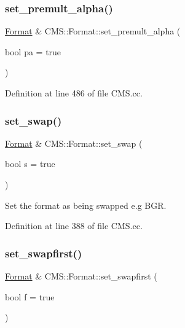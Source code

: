 \subsubsection{\texorpdfstring{set\+\_\+premult\+\_\+alpha()}{set\_premult\_alpha()}}
{\footnotesize\ttfamily \hyperlink{class_c_m_s_1_1_format}{Format} \& C\+M\+S\+::\+Format\+::set\+\_\+premult\+\_\+alpha (\begin{DoxyParamCaption}\item[{bool}]{pa = {\ttfamily true} }\end{DoxyParamCaption})}



Definition at line 486 of file C\+M\+S.\+cc.

\mbox{\label{class_c_m_s_1_1_format_a5438f6336d252ddbbb973739d121f593}} 
\subsubsection{\texorpdfstring{set\+\_\+swap()}{set\_swap()}}
{\footnotesize\ttfamily \hyperlink{class_c_m_s_1_1_format}{Format} \& C\+M\+S\+::\+Format\+::set\+\_\+swap (\begin{DoxyParamCaption}\item[{bool}]{s = {\ttfamily true} }\end{DoxyParamCaption})}



Set the format as being swapped e.\+g B\+GR. 



Definition at line 388 of file C\+M\+S.\+cc.

\mbox{\label{class_c_m_s_1_1_format_af2e7142d868f25be862cbb38f3132fb1}} 
\subsubsection{\texorpdfstring{set\+\_\+swapfirst()}{set\_swapfirst()}}
{\footnotesize\ttfamily \hyperlink{class_c_m_s_1_1_format}{Format} \& C\+M\+S\+::\+Format\+::set\+\_\+swapfirst (\begin{DoxyParamCaption}\item[{bool}]{f = {\ttfamily true} }\end{DoxyParamCaption})}



